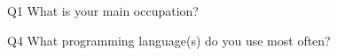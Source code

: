 \begin{description}%
\item{Q1} What is your main occupation?%
\item{Q4} What programming language(s) do you use most often?%
\end{description}%
